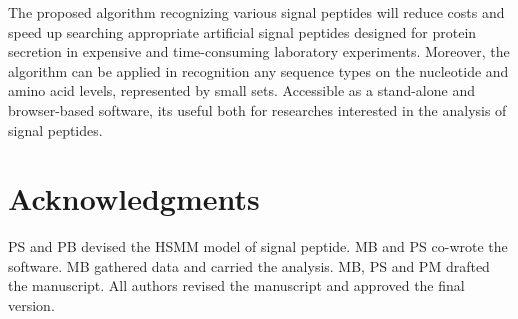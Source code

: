 \documentclass[fleqn,10pt,twoside]{gcb15submission}
\begin{document}
The proposed algorithm recognizing various signal peptides will reduce costs and speed up searching appropriate artificial signal peptides designed for protein secretion in expensive and time-consuming laboratory experiments. Moreover, the algorithm can be applied in recognition any sequence types on the nucleotide and amino acid levels, represented by small sets. Accessible as a stand-alone and browser-based software, its useful both for researches interested in the analysis of signal peptides.


\section*{Acknowledgments}
PS and PB devised the HSMM model of signal peptide. MB and PS co-wrote the software. MB gathered data and carried the analysis.
MB, PS and PM drafted the manuscript. All authors revised the manuscript and approved the final version.



\end{document}
